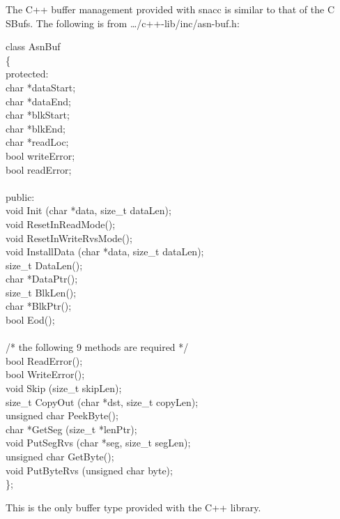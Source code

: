 The C++ buffer management provided with snacc is similar to that of
the C {\C SBuf}s.  The following is from
{\ufn \dots/c++-lib/inc/asn-buf.h}:
\begin{Ccode}
class AsnBuf\\
\{\\
protected:\+\\
  char			\>\>*dataStart;\\
  char			\>\>*dataEnd;\\
  char			\>\>*blkStart;\\
  char			\>\>*blkEnd;\\
  char			\>\>*readLoc;\\
  bool			\>\>writeError;\\
  bool			\>\>readError;\\
\\
\<public:\\
  void			\>\>Init (char *data, size\_t dataLen);\\
  void			\>\>ResetInReadMode();\\
  void			\>\>ResetInWriteRvsMode();\\
  void			\>\>InstallData (char *data, size\_t dataLen);\\
  size\_t		\>\>DataLen();\\
  char			\>\>*DataPtr();\\
  size\_t		\>\>BlkLen();\\
  char			\>\>*BlkPtr();\\
  bool			\>\>Eod();\\
\\
  /* the following 9 methods are required */\\
  bool			\>\>ReadError();\\
  bool			\>\>WriteError();\\
  void			\>\>Skip (size\_t skipLen);\\
  size\_t		\>\>CopyOut (char *dst, size\_t copyLen);\\
  unsigned char		\>\>PeekByte();\\
  char			\>\>*GetSeg (size\_t *lenPtr);\\
  void			\>\>PutSegRvs (char *seg, size\_t segLen);\\
  unsigned char		\>\>GetByte();\\
  void			\>\>PutByteRvs (unsigned char byte);\\
\<\};
\end{Ccode}

This is the only buffer type provided with the C++ library.

